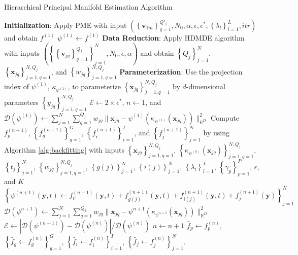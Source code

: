 \documentclass[11pt,reqno]{article}
\theoremstyle{definition}
\begin{document}
\begin{algorithm}
\caption{Hierarchical Principal Manifold Estimation Algorithm}\label{alg:hpme}
  \textbf{Initialization}: Apply PME with input $\left(\left\{\mathbf{v}_{1m}\right\}_{q=1}^{Q'_1}, N_0, \alpha, \epsilon, \epsilon^{*}, \left\{\lambda_l\right\}_{l=1}^{L}, itr\right)$ and obtain $f^{(1)}$\;
  $\psi^{(1)} \gets f^{(1)}$\;
  \textbf{Data Reduction}: Apply HDMDE algorithm with inputs $\left(\left\{\left\{\mathbf{v}_{jq}\right\}_{q=1}^{Q_j}\right\}_{j=1}^{N}, N_0, \epsilon, \alpha\right)$ and obtain $\left\{Q_j\right\}_{j=1}^{N}$, $\left\{\mathbf{x}_{jq}\right\}_{j=1, q=1}^{N, Q_j}$, and $\left\{w_{jq}\right\}_{j=1, q=1}^{N, Q_j}$\;
  \textbf{Parameterization}: Use the projection index of $\psi^{(1)}$, $\kappa_{\psi^{(1)}}$, to parameterize $\left\{\mathbf{x}_{jq}\right\}_{j=1, q=1}^{N, Q_j}$ by $d$-dimensional parameters $\left\{y_{jq}\right\}_{j=1, q=1}^{N, Q_j}$\;
  $\mathcal{E} \gets 2 \times \epsilon^{*}$, $n \gets 1$, and $\mathcal{D}(\psi^{(1)}) \gets \sum_{j=1}^{N}\sum_{q=1}^{Q_j}w_{jq}\|\mathbf{x}_{jq} - \psi^{(1)}\left(\kappa_{\psi^{(1)}}(\mathbf{x}_{jq})\right)\|_{\mathbb{R}^{D}}^2$\;
   {
    Compute $f_{p}^{(n + 1)}$, $\left\{f_{g}^{(n + 1)}\right\}_{g = 1}^{G}$, $\left\{f_{i}^{(n + 1)}\right\}_{i=1}^{I}$, and $\left\{f_{j}^{(n+1)}\right\}_{j=1}^{N}$ by using Algorithm \ref{alg:backfitting} with inputs $\left\{\mathbf{x}_{jq}\right\}_{j=1, q=1}^{N, Q_j}$, $\left\{\kappa_{\psi^{(n)}}(\mathbf{x}_{jq})\right\}_{j=1, q=1}^{N, Q_j}$, $\left\{t_j\right\}_{j=1}^{N}$, $\left\{w_{jq}\right\}_{j=1, q=1}^{N, Q_j}$, $\left\{g(j)\right\}_{j=1}^{N}$, $\left\{i(j)\right\}_{j=1}^{N}$, $\left\{\lambda_l\right\}_{l=1}^{L}$, $\left\{\gamma_p\right\}_{p=1}^{P}$, $\epsilon$, and $K$\;
    $\left\{\psi^{(n+1)}(\mathbf{y}, t) \gets f_{p}^{(n + 1)}(\mathbf{y}, t) + f_{g(j)}^{(n+1)}(\mathbf{y}, t) + f_{i(j)}^{(n + 1)}(\mathbf{y}, t) + f_{j}^{(n+1)}(\mathbf{y})\right\}_{j=1}^{N}$\;
    $\mathcal{D}(\psi^{n+1}) \gets \sum_{j=1}^{N}\sum_{q=1}^{Q_j}w_{jq}\|\mathbf{x}_{jq} - \psi^{n + 1}\left(\kappa_{\psi^{n+1}}(\mathbf{x}_{jq})\right)\|_{\mathbb{R}^{D}}^2$\;
    $\mathcal{E} \gets |\mathcal{D}(\psi^{(n+1)}) - \mathcal{D}(\psi^{(n)})| / \mathcal{D}(\psi^{(n)})$\;
    $n \gets n + 1$\;
  }
  $\hat{f}_p \gets f_{p}^{(n)}$, $\left\{\hat{f}_{g} \gets f_{g}^{(n)}\right\}_{g=1}^{G}$, $\left\{\hat{f}_{i} \gets f_{i}^{(n)}\right\}_{i=1}^{I}$, $\left\{\hat{f}_j \gets f_{j}^{(n)}\right\}_{j=1}^{N}$.
\end{algorithm}
\end{document}
